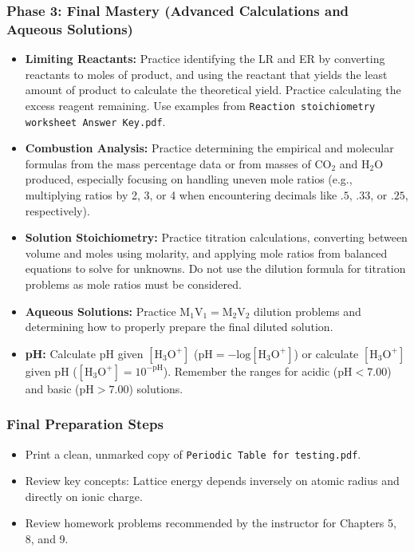\documentclass{article}
\begin{document}
\bigskip %

\subsubsection*{Phase 3: Final Mastery (Advanced Calculations and Aqueous Solutions)}
\begin{itemize}
    \item \textbf{Limiting Reactants:} Practice identifying the LR and ER by converting reactants to moles of product, and using the reactant that yields the least amount of product to calculate the theoretical yield. Practice calculating the excess reagent remaining. Use examples from \texttt{Reaction stoichiometry worksheet Answer Key.pdf}.
    \item \textbf{Combustion Analysis:} Practice determining the empirical and molecular formulas from the mass percentage data or from masses of $\text{CO}_2$ and $\text{H}_2\text{O}$ produced, especially focusing on handling uneven mole ratios (e.g., multiplying ratios by 2, 3, or 4 when encountering decimals like $.5$, $.33$, or $.25$, respectively).
    \item \textbf{Solution Stoichiometry:} Practice titration calculations, converting between volume and moles using molarity, and applying mole ratios from balanced equations to solve for unknowns. Do not use the dilution formula for titration problems as mole ratios must be considered.
    \item \textbf{Aqueous Solutions:} Practice $\text{M}_1\text{V}_1 = \text{M}_2\text{V}_2$ dilution problems and determining how to properly prepare the final diluted solution.
    \item \textbf{pH:} Calculate $\text{pH}$ given $[\text{H}_3\text{O}^+]$ ($\text{pH} = -\text{log}[\text{H}_3\text{O}^+]$) or calculate $[\text{H}_3\text{O}^+]$ given $\text{pH}$ ($[\text{H}_3\text{O}^+] = 10^{-\text{pH}}$). Remember the ranges for acidic ($\text{pH} < 7.00$) and basic ($\text{pH} > 7.00$) solutions.
\end{itemize}

\bigskip %
\subsubsection*{Final Preparation Steps}
\begin{itemize}
    \item Print a clean, unmarked copy of \texttt{Periodic Table for testing.pdf}.
    \item Review key concepts: Lattice energy depends inversely on atomic radius and directly on ionic charge.
    \item Review homework problems recommended by the instructor for Chapters 5, 8, and 9.
\end{itemize}
\end{document}
